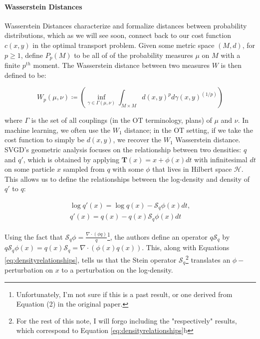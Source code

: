 \documentclass[12pt]{article}
\begin{document}
\paragraph{Wasserstein Distances} Wasserstein Distances characterize and formalize distances between probability distributions, which as we will see soon, connect back to our cost function $c(x, y)$ in the optimal transport problem. Given some metric space $(M, d)$, for $p \geq 1$, define $P_p(M)$ to be all of of the probability measures $\mu$ on $M$ with a finite $p^{th}$ moment. The Wasserstein distance between two measures $W$ is then defined to be:

\begin{equation}
    W_p(\mu, \nu) \coloneqq (\inf_{\gamma \in \Gamma(\mu, \nu)} \int_{M \times M} d(x, y)^pd\gamma(x, y)^{(1/p)})
\end{equation}

\noindent where $\Gamma$ is the set of all couplings (in the OT terminology, plans) of $\mu$ and $\nu$. In machine learning, we often use the $W_1$ distance; in the OT setting, if we take the cost function to simply be $d(x, y)$, we recover the $W_1$ Wasserstein distance. \\

\noindent SVGD's geometric analysis focuses on the relationship between two densities: $q$ and $q'$, which is obtained by applying $\mathbf{T}(x) = x + \phi(x)dt$ with infinitesimal $dt$ on some particle $x$ sampled from $q$ with some $\phi$ that lives in Hilbert space $\mathcal{H}$. This allows us to define the relationships between the log-density and density of $q'$ to $q$:

\begin{subequations}
\label{eq:densityrelationships}
\begin{eqnarray}
 \log q'(x) = \log q(x) - \mathcal{S}_q\phi(x)dt, \\
 q'(x) = q(x) - q(x)\mathcal{S}_q\phi(x)dt
\end{eqnarray}
\end{subequations}

\noindent Using the fact that $\mathcal{S}_q\phi = \frac{\nabla \cdot (\phi q)}{q}$\footnote{Unfortunately, I'm not sure if this is a past result, or one derived from Equation (2) in the original paper.}, the authors define an operator $q\mathcal{S}_q$ by $q\mathcal{S}_q\phi(x) = q(x)\mathcal{S}_q = \nabla \cdot (\phi(x) q(x))$. This, along with Equations \ref{eq:densityrelationships}, tells us that the Stein operator $\mathcal{S}_q$\footnote{For the rest of this note, I will forgo including the "respectively" results, which correspond to Equation \ref{eq:densityrelationships}b} translates an $\phi-$perturbation on $x$ to a perturbation on the log-density. 
\\
\end{document}
